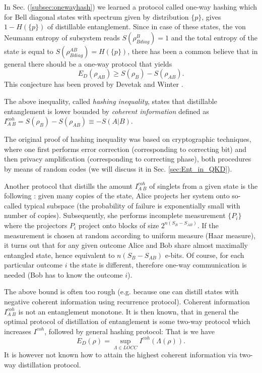 \documentclass[rmp,12pt,preprint]{revtex4-2}
\begin{document}
In Sec. (\ref{subsec:onewayhash}) we learned a protocol called one-way
hashing which for Bell diagonal states with spectrum given by
distribution $\{p\}$, gives $1-H(\{p\})$ of distillable
entanglement. Since in case of these states, the von Neumann entropy
of subsystem reads $S(\rho^{B}_{Bdiag})=1$ and the total entropy of
the state is equal to $S(\rho^{AB}_{Bdiag})=H(\{p\})$, there has been
a common believe that in general there should be a one-way protocol
that yields \begin{equation} E_D(\rho_{AB})\geq S(\rho_{B})- S(\rho_{AB}).  \end{equation}
This conjecture has been proved by Devetak and Winter
\cite{DevetakWinter-hash}.

The above inequality, called {\it hashing inequality}, states that
distillable entanglement is lower bounded by {\it coherent
  information} defined as $I^{coh}_{A\>B}=S(\rho_B)-S(\rho_{AB})\equiv
-S(A|B)$.

The original proof of hashing inequality
\cite{DevetakWinter-hash,DevetakWinter-hash-prl} was based on
cryptographic techniques, where one first performs error correction
(corresponding to correcting bit) and then privacy amplification
(corresponding to correcting phase), both procedures by means of
random codes (we will discuss it in Sec. \ref{sec:Ent_in_QKD}).

Another protocol that distills the amount $I^{coh}_{A\>B}$ of singlets
from a given state is the following \cite{SW-nature,sw-long}: given
many copies of the state, Alice projects her system onto so-called
typical subspace \cite{Schumacher1995} (the probability of failure is
exponentially small with number of copies). Subsequently, she performs
incomplete measurement $\{P_i\}$ where the projectors $P_i$ project
onto blocks of size $2^{n (S_B-S_{AB})}$. If the measurement is chosen
at random according to uniform measure (Haar measure), it turns out
that for any given outcome Alice and Bob share almost maximally
entangled state, hence equivalent to $n(S_B -S_{AB})$ e-bits. Of
course, for each particular outcome $i$ the state is different,
therefore one-way communication is needed (Bob has to know the outcome
$i$).

The above bound is often too rough (e.g. because one can distill
states with negative coherent information using recurrence
protocol). Coherent information $I^{coh}_{A\>B}$
is not an entanglement monotone. It is then known, that in general
the optimal protocol of distillation of entanglement is some two-way
protocol which increases $I^{coh}$, followed by general hashing
protocol: That is we have \cite{HHH-cap2000}
\begin{equation} E_D(\rho) = \sup_{\Lambda \in LOCC} I^{coh}(\Lambda(\rho)). \end{equation}
It is however not
known how to attain the highest coherent information via two-way distillation protocol.
\end{document}
